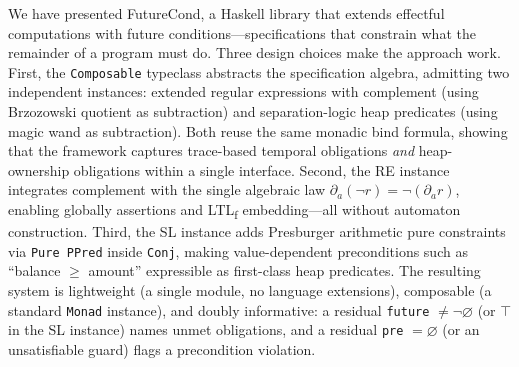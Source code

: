\documentclass[acmsmall,screen]{acmart}
\newcommand{\univ}{\neg\varnothing}
\begin{document}
We have presented FutureCond, a Haskell library that extends effectful
computations with future conditions---specifications that constrain what
the remainder of a program must do.
Three design choices make the approach work.
First, the \lstinline{Composable} typeclass abstracts the specification
algebra, admitting two independent instances: extended regular expressions
with complement (using Brzozowski quotient as subtraction) and
separation-logic heap predicates (using magic wand as subtraction).
Both reuse the same monadic bind formula, showing that the framework
captures trace-based temporal obligations \emph{and} heap-ownership
obligations within a single interface.
Second, the RE instance integrates complement with the single algebraic
law $\partial_a(\neg r) = \neg(\partial_a r)$, enabling globally
assertions and LTL\textsubscript{f} embedding---all without automaton
construction.
Third, the SL instance adds Presburger arithmetic pure constraints via
\lstinline{Pure PPred} inside \lstinline{Conj}, making value-dependent
preconditions such as ``balance $\geq$ amount'' expressible as first-class
heap predicates.
The resulting system is lightweight (a single module, no language
extensions), composable (a standard \lstinline{Monad} instance), and
doubly informative: a residual \lstinline{future} $\neq \univ$ (or $\top$
in the SL instance) names unmet obligations, and a residual
\lstinline{pre} $= \varnothing$ (or an unsatisfiable guard) flags a
precondition violation.



\end{document}
